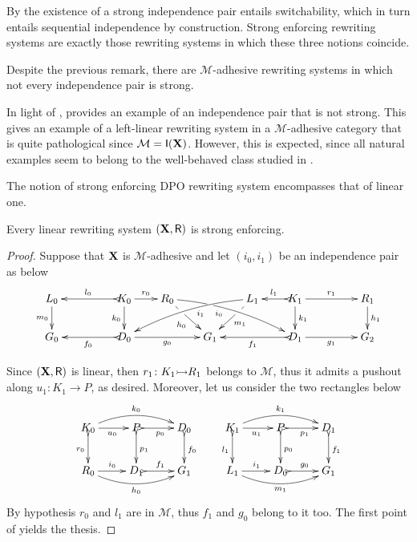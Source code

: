\begin{remark}
	By  the existence of a strong independence pair
	entails switchability, which in turn entails sequential
	independence by construction. Strong enforcing rewriting systems are exactly
	those rewriting systems in which these three notions coincide.
\end{remark}

Despite the previous remark, there are $\mathcal{M}$-adhesive rewriting systems in which not every independence pair is strong.

\begin{example}
	\label{ex:diff2}
	In light of ,  provides an example of
	an independence pair that is not strong. This gives an example of a
	left-linear rewriting system in a $\mathcal{M}$-adhesive category that is quite
	pathological since $\mathcal{M}=\mathsf{I(\textbf {\textup{X}})}$. However, this is expected, 
	since all natural examples seem to belong to the well-behaved class studied in .
\end{example}




The notion of strong enforcing DPO rewriting system encompasses that of linear one.


\begin{proposition}\label{prop:linstrong}
	Every linear rewriting system $(\textbf {\textup{X}}, \mathsf{R})$ is strong enforcing.
\end{proposition}
\begin{proof}
	Suppose that $\textbf {\textup{X}}$ is $\mathcal{M}$-adhesive and let $(i_0, i_1)$ be
	an independence pair as below
\[\xymatrix@R=20pt@C=20pt{L_0 \ar[d]_{m_0}&& K_0
	\ar[d]_{k_0}\ar@{>->}[ll]_{l_0} \ar[r]^{r_0} & R_0
	\ar@{>}@/^.25cm/[drrr]|(.32)\hole_(.4){i_0}
	\ar[dr]|(.33)\hole_{h_0} && L_1 \ar@{>}@/_.25cm/[dlll]^(.4){i_1}
	\ar[dl]|(.33)\hole^{m_1}& K_1 \ar[d]^{k_1}\ar@{>->}[l]_{l_1}
	\ar[rr]^{r_1} && R_1 \ar[d]^{h_1}\\G_0 && \ar@{>->}[ll]^{f_0}
	D_0 \ar[rr]_{g_0}&& G_1 && \ar@{>->}[ll]^{f_1} D_1
	\ar[rr]_{g_1}&& G_2}
\]
	
	Since $(\textbf {\textup{X}}, \mathsf{R})$ is linear, then $r_1\colon K_1\mto R_1$ belongs to
	$\mathcal{M}$, thus it admits a pushout along $u_1\colon K_1\to P$,
	as desired. Moreover, let us consider the two rectangles below
	\[
	\xymatrix{K_0 \ar@/^.4cm/[rr]^{k_0}\ar@{>->}[d]_{r_0}\ar[r]_{u_0}
		&P\ar@{>->}[d]^{p_1} \ar@{>->}[r]_{p_0} & D_0
		\ar@{>->}[d]^{f_0}& K_1
		\ar@/^.4cm/[rr]^{k_1}\ar@{>->}[d]_{l_1}\ar[r]_{u_1}
		&P\ar@{>->}[d]^{p_0} \ar@{>->}[r]_{p_1} & D_1
		\ar@{>->}[d]^{f_1}\\ R_0 \ar@/_.4cm/[rr]_{h_0} \ar[r]^{i_0}&D_1
		\ar@{>->}[r]^{f_1} & G_1& L_1 \ar@/_.4cm/[rr]_{m_1}
		\ar[r]^{i_1}&D_0 \ar@{>->}[r]^{g_0} & G_1} \] By hypothesis
	$r_0$ and $l_1$ are in $\mathcal{M}$, thus $f_1$ and $g_0$ belong to
	it too. The first point of  yields the thesis.
\end{proof}


